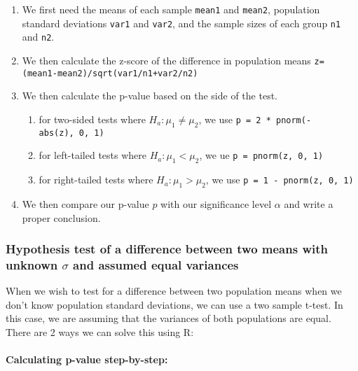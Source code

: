 \begin{enumerate}
\def\labelenumi{\arabic{enumi}.}
\item
  We first need the means of each sample \texttt{mean1} and
  \texttt{mean2}, population standard deviations \texttt{var1} and
  \texttt{var2}, and the sample sizes of each group \texttt{n1} and
  \texttt{n2}.
\item
  We then calculate the z-score of the difference in population means
  \texttt{z=(mean1-mean2)/sqrt(var1/n1+var2/n2)}
\item
  We then calculate the p-value based on the side of the test.

  \begin{enumerate}
  \def\labelenumii{\alph{enumii}.}
  \item
    for two-sided tests where \(H_a: \mu_1 \neq \mu_2\), we use
    \texttt{p\ =\ 2\ *\ pnorm(-abs(z),\ 0,\ 1)}
  \item
    for left-tailed tests where \(H_a: \mu_1 < \mu_2\), we ue
    \texttt{p\ =\ pnorm(z,\ 0,\ 1)}
  \item
    for right-tailed tests where \(H_a: \mu_1 > \mu_2\), we use
    \texttt{p\ =\ 1\ -\ pnorm(z,\ 0,\ 1)}
  \end{enumerate}
\item
  We then compare our p-value \(p\) with our significance level
  \(\alpha\) and write a proper conclusion.
\end{enumerate}

\hypertarget{hypothesis-test-of-a-difference-between-two-means-with-unknown-sigma-and-assumed-equal-variances}{%
\subsubsection{\texorpdfstring{Hypothesis test of a difference between
two means with unknown \(\sigma\) and assumed equal
variances}{Hypothesis test of a difference between two means with unknown \textbackslash sigma and assumed equal variances}}\label{hypothesis-test-of-a-difference-between-two-means-with-unknown-sigma-and-assumed-equal-variances}}

When we wish to test for a difference between two population means when
we don't know population standard deviations, we can use a two sample
t-test. In this case, we are assuming that the variances of both
populations are equal. There are 2 ways we can solve this using R:

\hypertarget{calculating-p-value-step-by-step}{%
\paragraph{Calculating p-value
step-by-step:}\label{calculating-p-value-step-by-step}}

